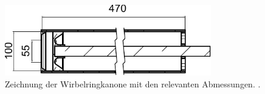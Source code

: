 \begin{figure}
\centering
\includegraphics[width=0.8\textwidth]{papers/wirbelringe/fig/zeichnung.pdf}
\caption{Zeichnung der Wirbelringkanone mit den relevanten Abmessungen. \cite{Wirbelringe:3D_modelle}. \label{Wirbelringe:fig:zeichnung}}
\end{figure}